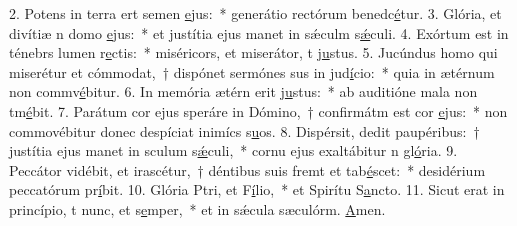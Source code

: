 2. Potens in terra ert semen \uline{e}jus:~* generátio rectórum benedc\uline{é}tur.
3. Glória, et divítiæ n domo \uline{e}jus:~* et justítia ejus manet in sǽculm s\uline{ǽ}culi.
4. Exórtum est in ténebrs lumen r\uline{e}ctis:~* miséricors, et miserátor, t j\uline{u}stus.
5. Jucúndus homo qui miserétur et cómmodat,~† dispónet sermónes sus in jud\uline{í}cio:~* quia in ætérnum non commv\uline{é}bitur.
6. In memória ætérn erit j\uline{u}stus:~* ab auditióne mala non tm\uline{é}bit.
7. Parátum cor ejus speráre in Dómino,~† confirmátm est cor \uline{e}jus:~* non commovébitur donec despíciat inimícs s\uline{u}os.
8. Dispérsit, dedit paupéribus:~† justítia ejus manet in sculum s\uline{ǽ}culi,~* cornu ejus exaltábitur n gl\uline{ó}ria.
9. Peccátor vidébit, et irascétur,~† déntibus suis fremt et tab\uline{é}scet:~* desidérium peccatórum pr\uline{í}bit.
10. Glória Ptri, et F\uline{í}lio,~* et Spirítu S\uline{a}ncto.
11. Sicut erat in princípio, t nunc, et s\uline{e}mper,~* et in sǽcula sæculórm. \uline{A}men.
